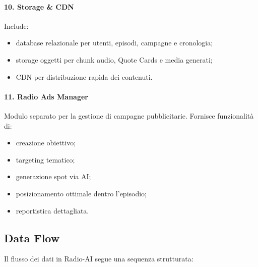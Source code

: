 \documentclass[11pt,a4paper]{article}
\begin{document}
\paragraph{10. Storage \& CDN}
Include:
\begin{itemize}
    \item database relazionale per utenti, episodi, campagne e cronologia;
    \item storage oggetti per chunk audio, Quote Cards e media generati;
    \item CDN per distribuzione rapida dei contenuti.
\end{itemize}

\paragraph{11. Radio Ads Manager}
Modulo separato per la gestione di campagne pubblicitarie.  
Fornisce funzionalità di:
\begin{itemize}
    \item creazione obiettivo;
    \item targeting tematico;
    \item generazione spot via AI;
    \item posizionamento ottimale dentro l’episodio;
    \item reportistica dettagliata.
\end{itemize}

\subsection{Data Flow}

Il flusso dei dati in Radio-AI segue una sequenza strutturata:
\end{document}
